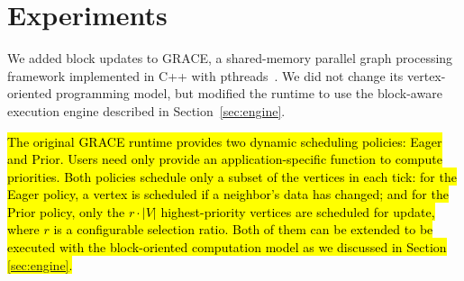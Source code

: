 \section{Experiments}
\label{sec:exps}

We added block updates to GRACE, a shared-memory parallel graph
processing framework implemented in
C++ with pthreads~\cite{Guozhang+13:GRACE}. We did not change its
vertex-oriented programming model, 
but modified the runtime to use the
block-aware execution engine described in
Section~\ref{sec:engine}.

\hl{%
%
The original GRACE runtime provides two dynamic scheduling policies:
Eager and Prior.  Users need only provide an application-specific
function to compute priorities.  Both policies schedule only a subset
of the vertices in each tick: for the Eager policy, a vertex is
scheduled if a neighbor's data has changed; and for the Prior policy,
only the $r \cdot |V|$ highest-priority vertices are scheduled for
update, where $r$ is a configurable selection ratio.  Both of them can be
extended to be executed with the block-oriented computation model as we discussed in 
Section {\ref{sec:engine}}.}





